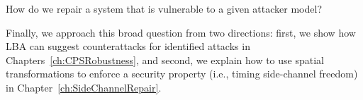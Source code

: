 \begin{question}
\label{que:Repair}
How do we repair a system that is vulnerable to a given attacker model?
\end{question}
Finally, we approach this broad question from two directions: first, we show how LBA can suggest counterattacks for identified attacks in Chapters~\ref{ch:CPSRobustness}, and second, we explain how to use spatial transformations to enforce a security property (i.e., timing side-channel freedom) in Chapter~\ref{ch:SideChannelRepair}. 



















